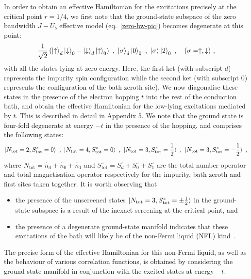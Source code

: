 In order to obtain an effective Hamiltonian for the excitations precisely at the critical point \(r=1/4\), we first note that the ground-state subspace of the zero bandwidth $J-U_{b}$ effective model (eq.~\eqref{zero-bw-pic}) becomes degenerate at this point:
\begin{eqnarray}
\frac{1}{\sqrt 2}\left(\ket{\uparrow}_d\ket{\downarrow}_0 - \ket{\downarrow}_d\ket{\uparrow}_0\right)~,~ \ket{\sigma}_d\ket{0}_0~,~\ket{\sigma}\ket{2}_0~,~~~ (\sigma=\uparrow,\downarrow)~,
\end{eqnarray}
with all the states lying at zero energy. Here, the first ket (with subscript \(d\)) represents the impurity spin configuration while the second ket (with subscript \(0\)) represents the configuration of the bath zeroth site). We now diagonalise these states in the presence of the electron hopping \(t\) into the rest of the conduction bath, and obtain the effective Hamiltonian for the low-lying excitations mediated by \(t\). This is described in detail in Appendix 5. We note that the ground state is four-fold degenerate at energy \(-t\) in the presence of the hopping, and comprises the following states:
\begin{eqnarray}
	\label{degenerate-nfl}
	\ket{N_\text{tot}=2,S^z_\text{tot}=0}~,~\ket{N_\text{tot}=4,S^z_\text{tot}=0}~, ~\ket{N_\text{tot}=3,S^z_\text{tot}=\frac{1}{2}}~,~\ket{N_\text{tot}=3,S^z_\text{tot}=-\frac{1}{2}}~,
\end{eqnarray}
where \(N_\text{tot} = \hat n_d + \hat n_0 + \hat n_1\) and \(S^z_\text{tot} = S^z_d + S^z_0 + S^z_1\) are the total number operator and total magnetisation operator respectively for the impurity, bath zeroth and first sites taken together. It is worth observing that
\begin{itemize}
	\item the presence of the unscreened states \(\ket{N_\text{tot}=3,S^z_\text{tot}=\pm\frac{1}{2}}\) in the ground-state subspace is a result of the inexact screening at the critical point, and
	\item the presence of a degenerate ground-state manifold indicates that these excitations of the bath will likely be of the non-Fermi liquid (NFL) kind~\cite{varma2002singular,si_kotliar_1993,Kotliar_1993}.
\end{itemize}
The precise form of the effective Hamiltonian for this non-Fermi liquid, as well as the behaviour of various correlation functions, is obtained by considering the ground-state manifold in conjunction with the excited states at energy \(-t\). 

